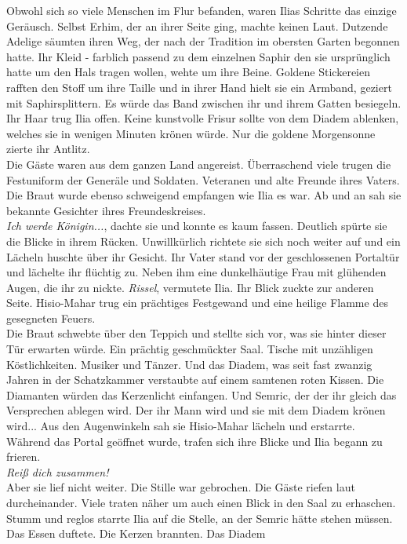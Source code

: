 Obwohl sich so viele Menschen im Flur befanden, waren Ilias Schritte das einzige Geräusch. 
Selbst Erhim, der an ihrer Seite ging, machte keinen Laut. Dutzende Adelige säumten ihren Weg, der 
nach der Tradition im obersten Garten begonnen hatte. Ihr Kleid - farblich passend zu dem einzelnen 
Saphir den sie ursprünglich hatte um den Hals tragen wollen, wehte um ihre Beine. Goldene 
Stickereien rafften den Stoff um ihre Taille und in ihrer Hand hielt sie ein Armband, geziert mit 
Saphirsplittern. Es würde das Band zwischen ihr und ihrem Gatten besiegeln. Ihr Haar trug Ilia 
offen. Keine kunstvolle Frisur sollte von dem Diadem ablenken, welches sie in wenigen Minuten krönen 
würde. Nur die goldene Morgensonne zierte ihr Antlitz.\\
Die Gäste waren aus dem ganzen Land angereist. Überraschend viele trugen die Festuniform der 
Generäle und Soldaten. Veteranen und alte Freunde ihres Vaters. Die Braut wurde ebenso schweigend 
empfangen wie Ilia es war. Ab und an sah sie bekannte Gesichter ihres Freundeskreises.\\
\textit{Ich werde Königin...}, dachte sie und konnte es kaum fassen. Deutlich spürte sie die Blicke 
in ihrem Rücken. Unwillkürlich richtete sie sich noch weiter auf und ein Lächeln huschte über ihr 
Gesicht. Ihr Vater stand vor der geschlossenen Portaltür und lächelte ihr flüchtig zu. Neben ihm 
eine dunkelhäutige Frau mit glühenden Augen, die ihr zu nickte. \textit{Rissel}, vermutete Ilia. 
Ihr Blick zuckte zur anderen Seite. Hisio-Mahar trug ein prächtiges Festgewand und eine heilige 
Flamme des gesegneten Feuers.\\
Die Braut schwebte über den Teppich und stellte sich vor, was sie hinter dieser Tür erwarten 
würde. Ein prächtig geschmückter Saal. Tische mit unzähligen Köstlichkeiten. Musiker und Tänzer. 
Und das Diadem, was seit fast zwanzig Jahren in der Schatzkammer verstaubte auf einem samtenen 
roten Kissen. Die Diamanten würden das Kerzenlicht einfangen. Und Semric, der der ihr gleich das 
Versprechen ablegen wird. Der ihr Mann wird und sie mit dem Diadem krönen wird...
Aus den Augenwinkeln sah sie Hisio-Mahar lächeln und erstarrte. Während das Portal geöffnet wurde, 
trafen sich ihre Blicke und Ilia begann zu frieren.\\
\textit{Reiß dich zusammen!}\\
Aber sie lief nicht weiter. Die Stille war gebrochen. Die Gäste riefen laut durcheinander. 
Viele traten näher um auch einen Blick in den Saal zu erhaschen. Stumm und reglos starrte Ilia auf 
die Stelle, an der Semric hätte stehen müssen. Das Essen duftete. Die Kerzen brannten. Das Diadem 
